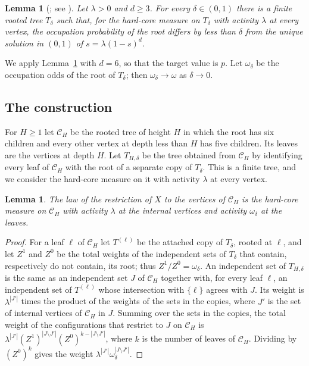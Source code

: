 \documentclass{amsart}
\numberwithin{equation}{section}
\numberwithin{table}{section}
\newtheorem{lemma}[theorem]{Lemma}
\theoremstyle{definition}
\theoremstyle{remark}
\begin{document}
\begin{lemma}[{\cite[Lemma~57]{CYYZ}; see \cite[Section~5]{RSV}}]\label{lem:gadget}
Let $\lambda>0$ and $d\ge3$. For every $\delta\in(0,1)$ there is a finite rooted tree $T_\delta$ such that, for the hard-core measure on $T_\delta$ with activity $\lambda$ at every vertex, the occupation probability of the root differs by less than $\delta$ from the unique solution in $(0,1)$ of $s=\lambda(1-s)^d$.
\end{lemma}

We apply Lemma~\ref{lem:gadget} with $d=6$, so that the target value is $p$. Let $\omega_\delta$ be the occupation odds of the root of $T_\delta$; then $\omega_\delta\to\omega$ as $\delta\to0$.

\subsection{The construction}
For $H\ge1$ let $\mathcal C_H$ be the rooted tree of height $H$ in which the root has six children and every other vertex at depth less than $H$ has five children. Its leaves are the vertices at depth $H$. Let $T_{H,\delta}$ be the tree obtained from $\mathcal C_H$ by identifying every leaf of $\mathcal C_H$ with the root of a separate copy of $T_\delta$. This is a finite tree, and we consider the hard-core measure on it with activity $\lambda$ at every vertex.

\begin{lemma}\label{lem:corelaw}
The law of the restriction of $X$ to the vertices of $\mathcal C_H$ is the hard-core measure on $\mathcal C_H$ with activity $\lambda$ at the internal vertices and activity $\omega_\delta$ at the leaves.
\end{lemma}

\begin{proof}
For a leaf $\ell$ of $\mathcal C_H$ let $T^{(\ell)}$ be the attached copy of $T_\delta$, rooted at $\ell$, and let $Z^1$ and $Z^0$ be the total weights of the independent sets of $T_\delta$ that contain, respectively do not contain, its root; thus $Z^1/Z^0=\omega_\delta$. An independent set of $T_{H,\delta}$ is the same as an independent set $J$ of $\mathcal C_H$ together with, for every leaf $\ell$, an independent set of $T^{(\ell)}$ whose intersection with $\{\ell\}$ agrees with $J$. Its weight is $\lambda^{|J'|}$ times the product of the weights of the sets in the copies, where $J'$ is the set of internal vertices of $\mathcal C_H$ in $J$. Summing over the sets in the copies, the total weight of the configurations that restrict to $J$ on $\mathcal C_H$ is $\lambda^{|J'|}(Z^1)^{|J\setminus J'|}(Z^0)^{k-|J\setminus J'|}$, where $k$ is the number of leaves of $\mathcal C_H$. Dividing by $(Z^0)^k$ gives the weight $\lambda^{|J'|}\omega_\delta^{|J\setminus J'|}$.
\end{proof}
\end{document}
